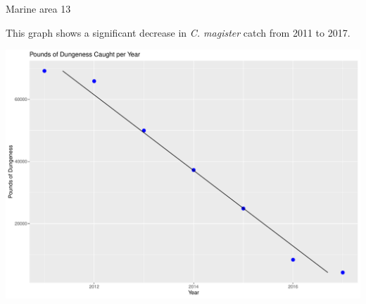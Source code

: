 \documentclass[ignorenonframetext,]{beamer}
\begin{document}
\begin{frame}{Marine area 13}

This graph shows a significant decrease in \emph{C. magister} catch from
2011 to 2017.

\includegraphics{Claudia-dungeness_files/figure-beamer/subset plot area 13-1.pdf}

\end{frame}
\end{document}
